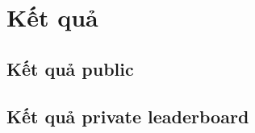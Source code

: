 \chapter{Kết quả}
\label{Chapter3}

\section{Kết quả public}

\section{Kết quả private leaderboard}


